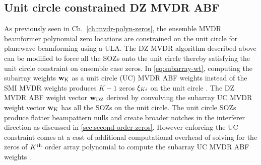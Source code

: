 \subsection{Unit circle constrained DZ MVDR ABF}
\label{sec:unit-circle-constr}
As previously seen in Ch.~\ref{ch:mvdr-polyn-zeros}, the ensemble MVDR
beamformer polynomial zero locations are constrained on the unit
circle for planewave beamforming using a ULA. The DZ MVDR algorithm
described above can be modified to force all the SOZs onto the unit
circle thereby satisfying the unit circle constraint on ensemble case
zeros. In \eqref{eq:subarray-wt}, computing the subarray weights
${\bf w}_{\rm K}$ as a unit circle (UC) MVDR ABF weights instead of the SMI MVDR
weights produces $K - 1$ zeros $\xi_{Ki}$ on the unit circle
\cite{tuladhar2015ucmvdr}. The DZ MVDR ABF weight vector ${\bf w}_{\rm DZ}$
derived by convolving the subarray UC MVDR weight vector ${\bf w}_{\rm K}$ has
all the SOZs on the unit circle. The unit circle SOZs produce flatter
beampattern nulls and create broader notches in the interferer
direction as discussed in \sect{}\ref{sec:second-order-zeros}. However
enforcing the UC constraint comes at a cost of additional
computational overhead of solving for the zeros of $K^{\rm th}$ order array
polynomial to compute the subarray UC MVDR ABF weights
\cite{tuladhar2015ucmvdr}.



